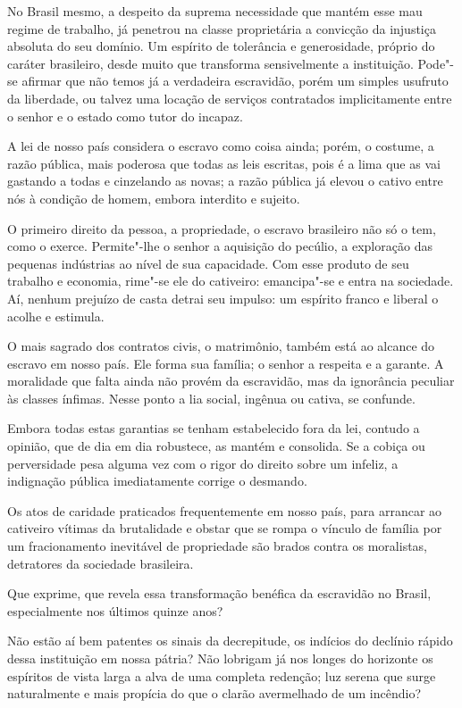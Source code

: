 No Brasil mesmo, a despeito da suprema necessidade que mantém esse mau
regime de trabalho, já penetrou na classe proprietária a convicção da
injustiça absoluta do seu domínio. Um espírito de tolerância e
generosidade, próprio do caráter brasileiro, desde muito que transforma
sensivelmente a instituição. Pode"-se afirmar que não temos já a
verdadeira escravidão, porém um simples usufruto da liberdade, ou
talvez uma locação de serviços contratados implicitamente entre o
senhor e o estado como tutor do incapaz. 

A lei de nosso país considera o escravo como coisa ainda; porém, o
costume, a razão pública, mais poderosa que todas as leis escritas,
pois é a lima que as vai gastando a todas e cinzelando as novas; a
razão pública já elevou o cativo entre nós à condição de homem, embora
interdito e sujeito.

O primeiro direito da pessoa, a propriedade, o escravo brasileiro não só
o tem, como o exerce. Permite"-lhe o senhor a aquisição do pecúlio, a
exploração das pequenas indústrias ao nível de sua capacidade. Com esse
produto de seu trabalho e economia, rime"-se ele do cativeiro:
emancipa"-se e entra na sociedade. Aí, nenhum prejuízo de casta detrai
seu impulso: um espírito franco e liberal o acolhe e estimula.

O mais sagrado dos contratos civis, o matrimônio, também está ao alcance
do escravo em nosso país. Ele forma sua família; o senhor a respeita e
a garante. A moralidade que falta ainda não provém da escravidão, mas
da ignorância peculiar às classes ínfimas. Nesse ponto a lia social,
ingênua ou cativa, se confunde.

Embora todas estas garantias se tenham estabelecido fora da lei, contudo
a opinião, que de dia em dia robustece, as mantém e consolida. Se a
cobiça ou perversidade pesa alguma vez com o rigor do direito sobre um
infeliz, a indignação pública imediatamente corrige o desmando. 

Os atos de caridade praticados frequentemente em nosso país, para
arrancar ao cativeiro vítimas da brutalidade e obstar que se rompa o
vínculo de família por um fracionamento inevitável de propriedade são
brados contra os moralistas, detratores da sociedade brasileira.

Que exprime, que revela essa transformação benéfica da escravidão no
Brasil, especialmente nos últimos quinze anos?

Não estão aí bem patentes os sinais da decrepitude, os indícios do
declínio rápido dessa instituição em nossa pátria? Não lobrigam já nos
longes do horizonte os espíritos de vista larga a alva de uma completa
redenção; luz serena que surge naturalmente e mais propícia do que o
clarão avermelhado de um incêndio? 

